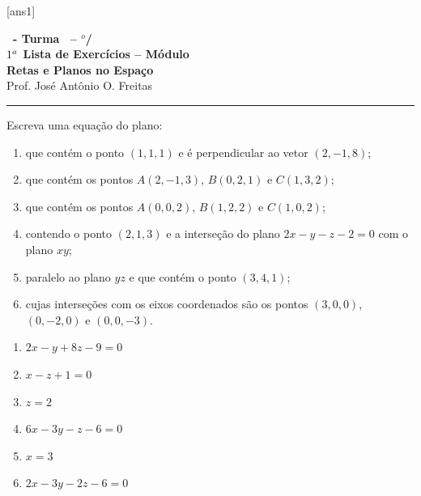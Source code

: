 \documentclass[12pt]{exam}
\begin{document}
[ans1]

\begin{center}
    {\Large\bf \disciplina\ - Turma \turma\ -- \semestre$^{o}$/\ano} \\ \vspace{9pt} {\large\bf
        $1^a$ Lista de Exercícios -- Módulo \numeromodulo\\ Retas e Planos no Espaço}\\ \vspace{9pt} Prof. José Antônio O. Freitas
\end{center}

\hrule

\vspace{.6cm}

\begin{exercicio}
    Escreva uma equação do plano:
    \begin{enumerate}[label=({\alph*})]
        \item que contém o ponto $(1,1,1)$ e é perpendicular ao vetor $(2,-1,8)$;
        \item que contém os pontos $A(2,-1,3)$, $B(0,2,1)$ e $C(1,3,2)$;
        \item que contém os pontos $A(0,0,2)$, $B(1,2,2)$ e $C(1,0,2)$;
        \item contendo o ponto $(2,1,3)$ e a interseção do plano $2x - y - z - 2 = 0$ com o plano $xy$;
        \item paralelo ao plano $yz$ e que contém o ponto $(3,4,1)$;
        \item cujas interseções com os eixos coordenados são os pontos $(3,0,0)$, $(0,-2,0)$ e $(0,0,-3)$.
    \end{enumerate}
    \begin{solucao}
        \begin{enumerate}[label=({\alph*})]
            \item $2x - y + 8z - 9 = 0$
            \item $x - z + 1 = 0$
            \item $z = 2$
            \item $6x - 3y - z - 6 = 0$
            \item $x = 3$
            \item $2x - 3y - 2z - 6 = 0$
        \end{enumerate}
    \end{solucao}
\end{exercicio}
\end{document}
